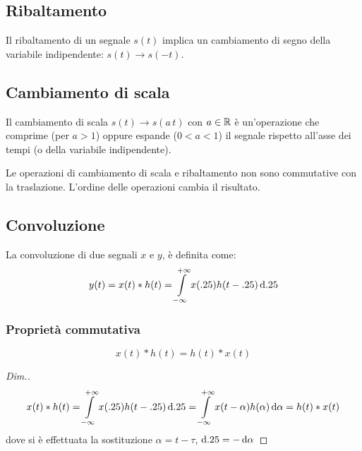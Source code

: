 \subsection{Ribaltamento}
Il ribaltamento di un segnale $s(t)$ implica un cambiamento di segno della variabile indipendente: $s(t) \to s(-t)$.
\subsection{Cambiamento di scala}
Il cambiamento di scala $s(t)\to s(a\,t)$ con $a\in\mathbb{R}$ è un'operazione che comprime (per $a>1$) oppure espande ($0<a<1$) il segnale rispetto all'asse dei tempi (o della variabile indipendente).

\begin{nota}Le operazioni di cambiamento di scala e ribaltamento non sono commutative con la traslazione. L'ordine delle operazioni cambia il risultato.\end{nota}

\subsection{Convoluzione}
La convoluzione di due segnali $x$ e $y$, è definita come:
\begin{equation}\label{eq:convoluzione}
y(t)=x(t)\ast  h(t)=\int\limits_{-\infty}^{+\infty}{x(.25)h(t-.25)}{\,\mathop{}\!\mathrm{d}{.25}}
\end{equation}

\subsubsection{Proprietà commutativa}
\begin{equation}
x(t)\ast h(t)= h(t)\ast x(t)
\end{equation}
\begin{proof}[Dim.]
	\[x(t)\ast h(t)=\int\limits_{-\infty}^{+\infty}{x(.25)h(t-.25)}{\,\mathop{}\!\mathrm{d}{.25}}=\int\limits_{-\infty}^{+\infty}{x(t-\alpha)h(\alpha)}{\,\mathop{}\!\mathrm{d}{\alpha}}=h(t)\ast x(t)\]
	dove si è effettuata la sostituzione $\alpha=t-\tau$, $\mathop{}\!\mathrm{d}.25=-\mathop{}\!\mathrm{d}\alpha$
\end{proof}
